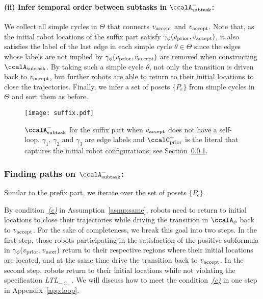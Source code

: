 \documentclass[Afour,sageh,times]{sagej}
\newcommand{\ltl}{ {\it LTL}$_{-\bigcirc}$ }
\newcommand{\auto}[1]{\ccalA_{\textup{#1}}}
\newcommand{\autop}{\ccalA_{\phi}}
\newcommand{\vertex}[1]{v_{\textup{#1}}}
\newcommand{\ag}[2]{\langle#1,#2\rangle}
\begin{document}
{{  \paragraph{(ii) Infer temporal order between subtasks in $\auto{subtask}^-$:} We collect all simple cycles in $\Theta$ that connects $\vertex{accept}$ and $\vertex{accept}$. %
  Note that, as the initial robot locations of the suffix part satisfy $\gamma_{\phi}(\vertex{prior}, \vertex{accept})$, it also satisfies the label of the last edge in each simple cycle $\theta\in \Theta$ since the edges whose labels are not implied by $\gamma_\phi(\vertex{prior}, \vertex{accept})$ are removed when constructing $\auto{subtask}$.
  By taking such a simple cycle $\theta$, not only the transition is driven back to $\vertex{accept}$, but further  robots are able to return to their initial locations to close the trajectories. %
 Finally, we infer a set of posets $\{P_e\}$ from simple cycles in $\Theta$ and sort them as before.
\begin{figure}[!t]
    \centering
    \texttt{[image: suffix.pdf]}
    \caption{$\auto{subtask}^-$ for the suffix part when $\vertex{accept}$ does not have a self-loop. $\gamma_1$, $\gamma_2$ and $\gamma_3$ are edge labels and $\ccalC_{\text{prior}}^+$ is the literal that captures the initial robot configurations; see Section~\ref{sec:suf_milp}.}
    \label{fig:suffix}
  \end{figure}
\subsubsection{Finding paths  on $\auto{subtask}^-$:}\label{sec:suf_milp} Similar to the prefix part, we iterate over the set of posets $\{P_e\}$.

By condition~\hyperref[asmp:c]{\it (c)} in Assumption~\ref{asmp:same}, robots need to return to initial locations to close their trajectories while driving the transition in $\autop$ back to $\vertex{accept}$. For the sake of completeness, we break this goal into two steps.  In the first step, those robots participating in the satisfaction of the positive subformula in $\gamma_\phi(\vertex{prior}, \vertex{next})$ return to their respective regions where their initial locations are located, and at the same time drive the transition back to $\vertex{accept}$. In the second step, robots return to their initial locations while not violating the specification \ltl. We will discuss how to  meet the condition~\hyperref[asmp:c]{\it (c)} in one step in Appendix~\ref{app:loop}.



}}
\end{document}
